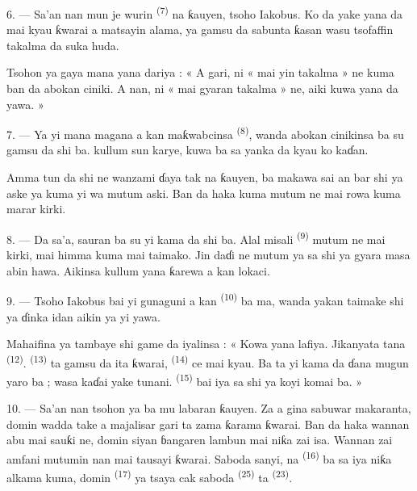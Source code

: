 6. --- Sa’an nan mun je wurin 
\textsuperscript{(7)} na ƙauyen, tsoho Iakobus. Ko da yake yana da
 mai kyau ƙwarai a matsayin alama, ya gamsu da
sabunta ƙasan wasu tsofaffin takalma da suka huda.

Tsohon ya gaya mana yana dariya : « A gari, ni « mai yin takalma » ne
kuma ban da abokan ciniki. A nan, ni « mai gyaran takalma » ne, aiki
kuwa yana da yawa. »

7. --- Ya yi mana magana a kan maƙwabcinsa 
\textsuperscript{(8)}, wanda abokan cinikinsa ba su gamsu da shi ba.
 kullum sun karye,  kuwa ba sa
yanka da kyau ko kaɗan.

Amma tun da shi ne wanzami ɗaya tak na ƙauyen, ba makawa sai an bar shi
ya aske ya kuma yi wa mutum aski. Ban da haka kuma mutum ne mai rowa
kuma marar kirki.

8. --- Da sa’a, sauran  ba su yi kama da shi ba. Alal
misali  \textsuperscript{(9)} mutum ne mai kirki,
mai himma kuma mai taimako. Jin daɗi ne mutum ya sa shi ya gyara masa
abin hawa. Aikinsa kullum yana ƙarewa a kan lokaci.

9. --- Tsoho Iakobus bai yi gunaguni a kan 
\textsuperscript{(10)} ba ma, wanda yakan taimake shi ya ɗinka
 idan aikin ya yi yawa.

Mahaifina ya tambaye shi game da iyalinsa : « Kowa yana lafiya.
Jikanyata tana  \textsuperscript{(12)}.
 \textsuperscript{(13)} ta gamsu da ita ƙwarai,
 \textsuperscript{(14)} ce mai kyau. Ba ta yi kama da
ɗana mugun yaro ba ; wasa kaɗai yake tunani. 
\textsuperscript{(15)} bai iya sa shi ya koyi komai ba. »

\VUsaut{3.0mm}
\VUsaut{3.0mm}

10. --- Sa’an nan tsohon ya ba mu labaran ƙauyen. Za a gina sabuwar
makaranta, domin wadda take a majalisar gari ta zama ƙarama ƙwarai.
Ban da haka wannan abu mai sauƙi ne, domin siyan ɓangaren lambun mai
niƙa zai isa. Wannan zai amfani mutumin nan mai tausayi ƙwarai. Saboda
sanyi,  na 
\textsuperscript{(16)} ba sa iya niƙa alkama kuma, domin
 \textsuperscript{(17)} ya tsaya cak saboda 
\textsuperscript{(25)} ta  \textsuperscript{(23)}.

